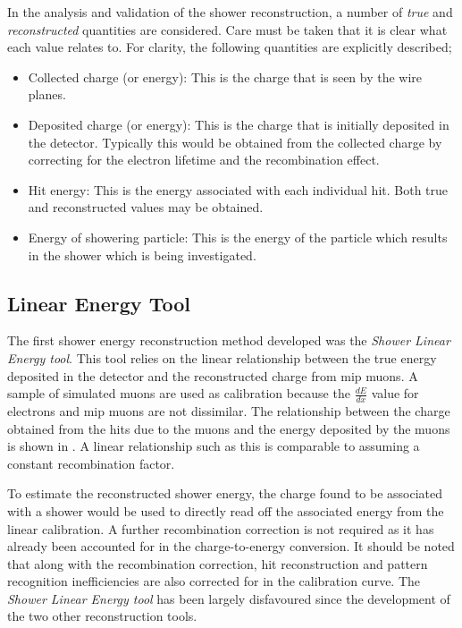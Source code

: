 In the analysis and validation of the shower reconstruction, a number of \textit{true} and \textit{reconstructed} quantities are considered. Care must be taken that it is clear what each value relates to. For clarity, the following quantities are explicitly described;
\begin{itemize}
    \item Collected charge (or energy): This is the charge that is seen by the wire planes. 
    \item Deposited charge (or energy): This is the charge that is initially deposited in the detector. Typically this would be obtained from the collected charge by correcting for the electron lifetime and the recombination effect.
    \item Hit energy: This is the energy associated with each individual hit. Both true and reconstructed values may be obtained.
    \item Energy of showering particle: This is the energy of the particle which results in the shower which is being investigated. 
\end{itemize}
\subsection{Linear Energy Tool}\label{subchap:Linear Energy Tool}
The first shower energy reconstruction method developed was the \textit{Shower Linear Energy tool}. This tool relies on the linear relationship between the true energy deposited in the detector and the reconstructed charge from \gls{mip} muons. A sample of simulated muons are used as calibration because the $\frac{dE}{dx}$ value for electrons and \Gls{mip} muons are not dissimilar. The relationship between the charge obtained from the hits due to the muons and the energy deposited by the muons is shown in . A linear relationship such as this is comparable to assuming a constant recombination factor. 


To estimate the reconstructed shower energy, the charge found to be associated with a shower would be used to directly read off the associated energy from the linear calibration. A further recombination correction is not required as it has already been accounted for in the charge-to-energy conversion. It should be noted that along with the recombination correction, hit reconstruction and pattern recognition inefficiencies are also corrected for in the calibration curve.  The \textit{Shower Linear Energy tool} has been largely disfavoured since the development of the two other reconstruction tools. 

